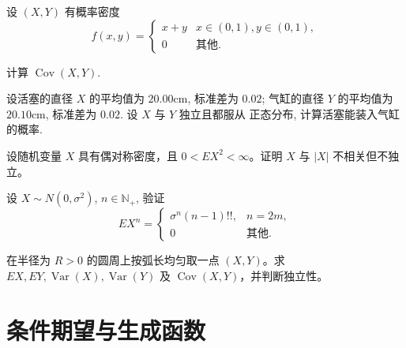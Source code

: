 \begin{exercise}[正方形密度的协方差]\label{q:A5.28}
设 $(X,Y)$ 有概率密度
    \[f(x,y)=\begin{cases}
        x+y & x\in(0,1),y\in(0,1), \\
        0 & \text{其他}.
    \end{cases}\]

    计算 $\operatorname{Cov}(X,Y)$.\par{}\end{exercise}

\begin{exercise}[正态尺寸差与装配]\label{q:A5.30}
设活塞的直径 $X$ 的平均值为 $20.00\text{cm}$, 标准差为 $0.02$; 气缸的直径 $Y$ 的平均值为 $20.10\text{cm}$, 标准差为 $0.02$. 设 $X$ 与 $Y$ 独立且都服从 正态分布, 计算活塞能装入气缸的概率.\par{}\end{exercise}

\begin{exercise}[不相关但不独立的反例]\label{q:A5.32}
设随机变量 $X$ 具有偶对称密度，且 $0<EX^2<\infty$。证明 $X$ 与 $|X|$ 不相关但不独立。\par{}\end{exercise}

\begin{exercise}[中心正态的高阶矩]\label{q:A5.33}
设 $X\sim N(0,\sigma^2)$, $n\in\mathbb{N}_+$, 验证
    \[EX^n=\begin{cases}
        \sigma^n(n-1)!!, & n=2m, \\
        0 & \text{其他}.
    \end{cases}\]\par{}\end{exercise}

\begin{exercise}[圆周与圆内均匀模型]\label{q:A5.35}
在半径为 $R>0$ 的圆周上按弧长均匀取一点 $(X,Y)$。求 $EX,EY,\operatorname{Var}(X),\operatorname{Var}(Y)$ 及 $\operatorname{Cov}(X,Y)$，并判断独立性。\par{}\end{exercise}

\clearpage\section{条件期望与生成函数}

